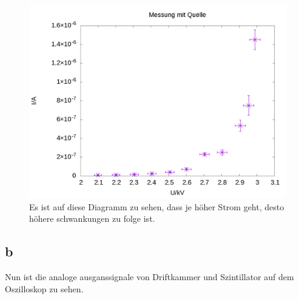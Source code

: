 \documentclass[12pt,ngerman]{article}
\begin{document}
\begin{figure}[htbp]
	\centering
	\includegraphics[width=0.45\textheight]{mit.png}
	\caption{ Es ist auf diese Diagramm zu sehen, dass je höher Strom geht, desto höhere schwankungen zu folge ist.}
	\label{figmit}
\end{figure}
\subsection{b}
Nun ist die analoge ausganssignale von Driftkammer und Szintillator auf dem Oszilloskop zu sehen.
 
\end{document}
